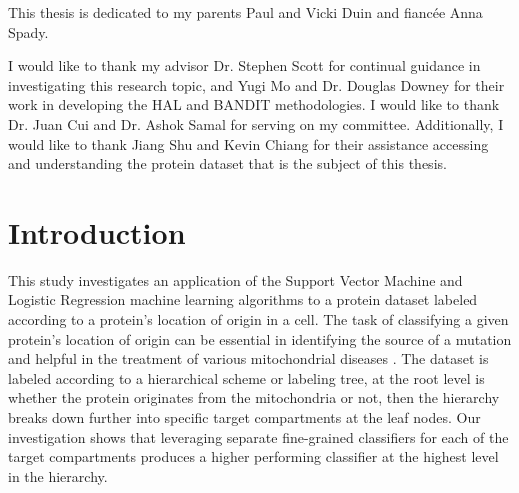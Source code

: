 \documentclass[ms]{nuthesis}
\begin{document}

\begin{dedication}
  This thesis is dedicated to my parents Paul and Vicki Duin and fianc\'{e}e Anna Spady.
\end{dedication}

\begin{acknowledgments}
  I would like to thank my advisor Dr. Stephen Scott for continual guidance in investigating this
  research topic, and Yugi Mo and Dr. Douglas Downey for their work in developing the HAL and
  BANDIT methodologies. I would like to thank Dr. Juan Cui and Dr. Ashok Samal for serving on
  my committee. Additionally, I would like to thank Jiang Shu and
  Kevin Chiang for their assistance accessing and understanding the protein dataset that is
  the subject of this thesis.
\end{acknowledgments}


{\small \tableofcontents}

\mainmatter

\chapter{Introduction}
\label{sect:Introduction}
This study investigates an application of the Support Vector Machine
and Logistic Regression machine learning algorithms to a protein dataset labeled
according to a protein's location of origin in a cell. The task of classifying
a given protein's location of origin can be essential in identifying the
source of a mutation and helpful in the treatment of various mitochondrial
diseases \cite{bioPoster}.
The dataset is labeled
according to a hierarchical scheme or labeling tree,
at the root level is whether the protein
 originates from the
mitochondria
or not, then the hierarchy breaks down further into specific target
compartments at the leaf nodes. Our investigation shows that leveraging separate
fine-grained classifiers for each of the target compartments produces a higher
performing classifier at the highest level in the hierarchy.
\end{document}
